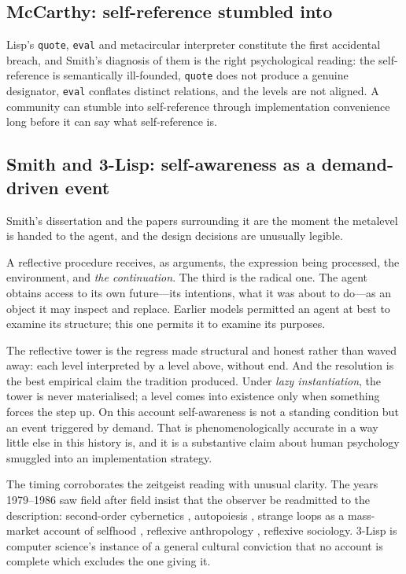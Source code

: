\documentclass[11pt,a4paper]{article}
\begin{document}
\subsection{McCarthy: self-reference stumbled into}

Lisp's \texttt{quote}, \texttt{eval} and metacircular interpreter
\cite{mccarthy1960} constitute the first accidental breach, and Smith's diagnosis
of them is the right psychological reading: the self-reference is semantically
ill-founded, \texttt{quote} does not produce a genuine designator, \texttt{eval}
conflates distinct relations, and the levels are not aligned. A community can
stumble into self-reference through implementation convenience long before it can
say what self-reference is.

\subsection{Smith and 3-Lisp: self-awareness as a demand-driven event}
\label{sec:smith}

Smith's dissertation and the papers surrounding it \cite{smith1982,smith1984,
desrivieres1984} are the moment the metalevel is handed to the agent, and the
design decisions are unusually legible.

A reflective procedure receives, as arguments, the expression being processed, the
environment, and \emph{the continuation}. The third is the radical one. The agent
obtains access to its own future---its intentions, what it was about to do---as an
object it may inspect and replace. Earlier models permitted an agent at best to
examine its structure; this one permits it to examine its purposes.

The reflective tower is the regress made structural and honest rather than waved
away: each level interpreted by a level above, without end. And the resolution is
the best empirical claim the tradition produced. Under \emph{lazy instantiation},
the tower is never materialised; a level comes into existence only when something
forces the step up. On this account self-awareness is not a standing condition but
an event triggered by demand. That is phenomenologically accurate in a way little
else in this history is, and it is a substantive claim about human psychology
smuggled into an implementation strategy.

The timing corroborates the zeitgeist reading with unusual clarity. The years
1979--1986 saw field after field insist that the observer be readmitted to the
description: second-order cybernetics \cite{vonfoerster1981}, autopoiesis
\cite{maturana1980}, strange loops as a mass-market account of selfhood
\cite{hofstadter1979}, reflexive anthropology \cite{clifford1986}, reflexive
sociology. 3-Lisp is computer science's instance of a general cultural conviction
that no account is complete which excludes the one giving it.
\end{document}
